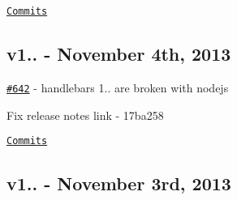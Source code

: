 \href{https://github.com/wycats/handlebars.js/compare/v1.1.1...v1.1.2}{\tt Commits}

\subsection*{v1.. -\/ November 4th, 2013}


\begin{DoxyItemize}
\item \href{https://github.com/wycats/handlebars.js/issues/642}{\tt \#642} -\/ handlebars 1.. are broken with nodejs
\item Fix release notes link -\/ 17ba258
\end{DoxyItemize}

\href{https://github.com/wycats/handlebars.js/compare/v1.1.0...v1.1.1}{\tt Commits}

\subsection*{v1.. -\/ November 3rd, 2013}


